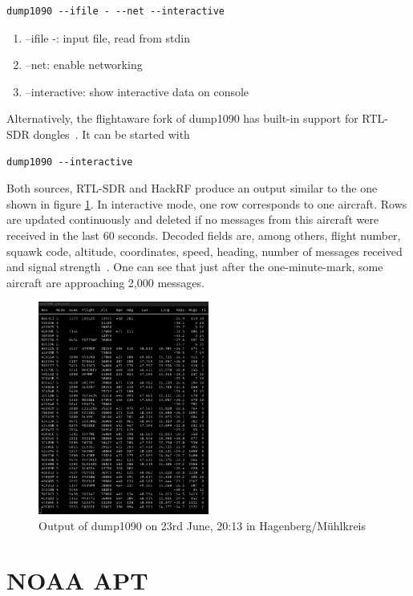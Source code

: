 \documentclass[conference]{IEEEtran}
\begin{document}
\begin{lstlisting}
dump1090 --ifile - --net --interactive
\end{lstlisting}
\begin{enumerate}
	\item --ifile -: input file, read from stdin
	\item --net: enable networking
	\item --interactive: show interactive data on console
\end{enumerate}
Alternatively, the flightaware fork of dump1090 has built-in support for RTL-SDR dongles~\cite{Github19dump1090-fa}. It can be started with
\begin{lstlisting}
dump1090 --interactive
\end{lstlisting}
Both sources, RTL-SDR and HackRF produce an output similar to the one shown in figure \ref{fig:dump1090screenshot}. In interactive mode, one row corresponds to one aircraft. Rows are updated continuously and deleted if no messages from this aircraft were received in the last 60 seconds. Decoded fields are, among others, flight number, squawk code, altitude, coordinates, speed, heading, number of messages received and signal strength~\cite{dump109019Github}. One can see that just after the one-minute-mark, some aircraft are approaching 2,000 messages. 
\begin{figure}
	\centering
	\caption{Output of dump1090 on 23rd June, 20:13 in Hagenberg/Mühlkreis} \label{fig:dump1090screenshot}
	\includegraphics[width=0.5\textwidth]{dump1090_screenshot}
\end{figure}

\section{NOAA APT} %
\end{document}
